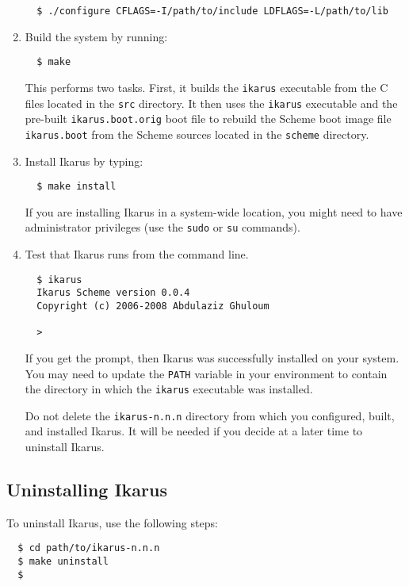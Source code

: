 \documentclass[onecolumn, 12pt, twoside, openright, dvipdfm]{book}
\begin{document}
\begin{enumerate}
\begin{verbatim}
  $ ./configure CFLAGS=-I/path/to/include LDFLAGS=-L/path/to/lib
\end{verbatim}

\item Build the system by running:
\begin{verbatim}
  $ make
\end{verbatim}
This performs two
tasks.  First, it builds the \texttt{ikarus} executable from the C
files located in the \texttt{src} directory.  It then uses the
\texttt{ikarus} executable and the pre-built
\texttt{ikarus.boot.orig} boot file to rebuild the Scheme boot image
file \texttt{ikarus.boot} from the Scheme sources located in the
\texttt{scheme} directory.

\item Install Ikarus by typing:
\begin{verbatim}
  $ make install
\end{verbatim}
If you are installing Ikarus in a system-wide location, you might
need to have administrator privileges (use the \texttt{sudo} or
\texttt{su} commands).

\item Test that Ikarus runs from the command line.
\begin{verbatim}
  $ ikarus
  Ikarus Scheme version 0.0.4
  Copyright (c) 2006-2008 Abdulaziz Ghuloum

  > 
\end{verbatim}
If you get the prompt, then Ikarus was successfully installed on
your system.  You may need to update the \texttt{PATH} variable in
your environment to contain the directory in which the
\texttt{ikarus} executable was installed.

Do not delete the \texttt{ikarus-n.n.n} directory from which you
configured, built, and installed Ikarus.  It will be needed if you
decide at a later time to uninstall Ikarus.

\end{enumerate}

\subsection{Uninstalling Ikarus}

To uninstall Ikarus, use the following steps:

\begin{verbatim}
  $ cd path/to/ikarus-n.n.n
  $ make uninstall
  $
\end{verbatim}
\end{document}
